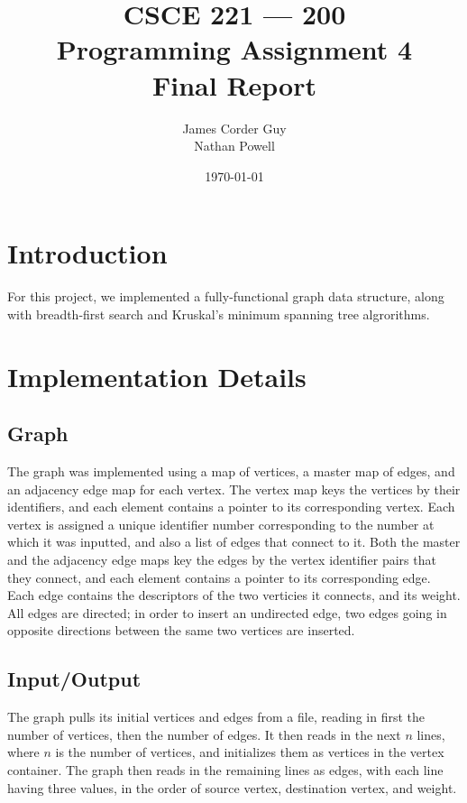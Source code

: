 \documentclass[titlepage]{article}
\title{
    \textbf{
        CSCE 221 --- 200 \\
        Programming Assignment 4 \\
        Final Report
    }
}
\author{
    James Corder Guy \\
    Nathan Powell
}
\date{
    \today
}
\begin{document}
    
    \maketitle
    \begin{multicols*}{2}
        \section{Introduction}
            For this project, we implemented a fully-functional graph data structure, along with breadth-first search and Kruskal's minimum spanning tree algrorithms.
        \section{Implementation Details}
            \subsection{Graph}
                The graph was implemented using a map of vertices, a master map of edges, and an adjacency edge map for each vertex. The vertex map keys the vertices by their identifiers, and each element contains a pointer to its corresponding vertex. Each vertex is assigned a unique identifier number corresponding to the number at which it was inputted, and also a list of edges that connect to it. Both the master and the adjacency edge maps key the edges by the vertex identifier pairs that they connect, and each element contains a pointer to its corresponding edge. Each edge contains the descriptors of the two verticies it connects, and its weight. All edges are directed; in order to insert an undirected edge, two edges going in opposite directions between the same two vertices are inserted.
            \subsection{Input/Output}
                The graph pulls its initial vertices and edges from a file, reading in first the number of vertices, then the number of edges. It then reads in the next $n$ lines, where $n$ is the number of vertices, and initializes them as vertices in the vertex container. The graph then reads in the remaining lines as edges, with each line having three values, in the order of source vertex, destination vertex, and weight.

\end{multicols*}
\end{document}
